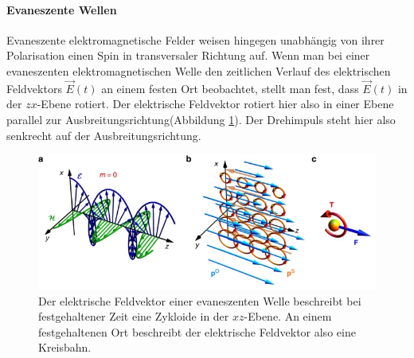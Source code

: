 \documentclass[titlepage,  ngerman]{article}
\begin{document}
	\paragraph{Evaneszente Wellen}	
	Evaneszente elektromagnetische Felder weisen hingegen unabhängig von ihrer Polarisation einen Spin in transversaler Richtung auf. Wenn man bei einer evaneszenten elektromagnetischen Welle den zeitlichen Verlauf des elektrischen Feldvektors $\vec{E}(t)$ an einem festen Ort beobachtet, stellt man fest, dass $\vec{E}(t)$ in der $zx$-Ebene rotiert. Der elektrische Feldvektor rotiert hier also in einer Ebene parallel zur Ausbreitungsrichtung(Abbildung \ref{fig:ev_spin}). Der Drehimpuls steht hier also senkrecht auf der Ausbreitungsrichtung. \cite{Bliokh.2014}	
	
	\begin{figure}[h]
		\centering
		\includegraphics[width=0.7\linewidth]{figures/spin/ev_spin}
		\caption[Spin evaneszente EM-Welle]{Der elektrische Feldvektor einer evaneszenten Welle beschreibt bei festgehaltener Zeit eine Zykloide in der $xz$-Ebene. An einem festgehaltenen Ort beschreibt der elektrische Feldvektor also eine Kreisbahn.}
		\label{fig:ev_spin}
	\end{figure}
\end{document}
